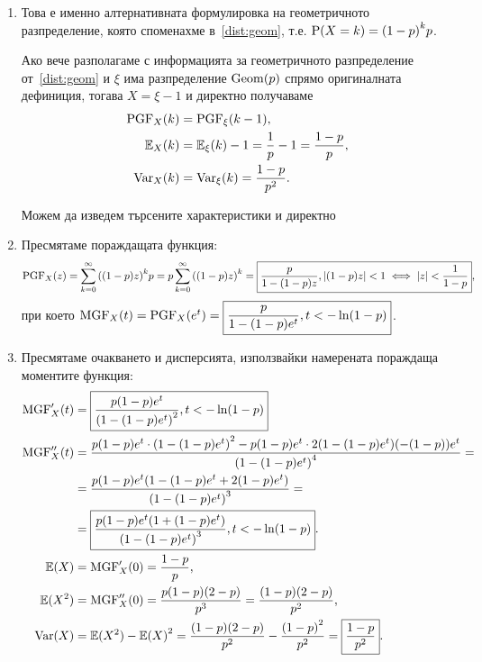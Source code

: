 \documentclass[numbers=endperiod, DIV=15, bibliography=totocnumbered]{scrartcl}
\begin{document}
\begin{solution}
  \mbox{}
  \begin{enumerate}[label=\alph*)]
    \item Това е именно алтернативната формулировка на геометричното разпределение, която споменахме в~\ref{dist:geom}, т.е. $\operatorname{P}(X = k) = {(1-p)}^k p$.

    Ако вече разполагаме с информацията за геометричното разпределение от~\ref{dist:geom} и $\xi$ има разпределение $\operatorname{Geom}(p)$ спрямо оригиналната дефиниция, тогава $X = \xi - 1$ и директно получаваме
    \begin{align*}
      \operatorname{PGF}_X(k) &= \operatorname{PGF}_\xi(k-1), \\
      \mathbb{E}_X(k) &= \mathbb{E}_\xi(k) - 1 = \frac 1 p - 1 = \frac {1-p} p, \\
      \operatorname{Var}_X(k) &= \operatorname{Var}_\xi(k) = \frac {1-p} {p^2}.
    \end{align*}

    Можем да изведем търсените характеристики и директно
    \item Пресмятаме пораждащата функция:
    \begin{displaymath}
      \operatorname{PGF}_X(z)
      =
      \sum_{k=0}^\infty {((1-p) z)}^k p
      =
      p \sum_{k=0}^\infty {((1-p) z)}^k
      =
      \boxed{\frac p {1 - (1-p)z}, \left\vert (1-p) z \right\vert < 1 \iff \left\vert z \right\vert < \frac 1 {1-p}},
    \end{displaymath}
    при което $\operatorname{MGF}_X(t) = \operatorname{PGF}_X(e^t) = \boxed{\frac p {1 - (1-p)e^t}, t < -\ln(1-p)}$.

    \item Пресмятаме очакването и дисперсията, използвайки намерената пораждаща моментите функция:
    \begingroup
    \allowdisplaybreaks
    \begin{align*}
      \operatorname{MGF}'_X(t)
      &=
      \boxed{\frac {p (1-p) e^t} {{(1-(1-p)e^t)}^2}, t < -\ln(1-p)}
      \\
      \operatorname{MGF}''_X(t)
      &=
      \frac {p (1-p) e^t \cdot {(1-(1-p)e^t)}^2 - p (1-p) e^t \cdot 2 (1-(1-p)e^t) (-(1-p)) e^t} {{(1-(1-p)e^t)}^4}
      = \\ &=
      \frac {p (1-p) e^t (1-(1-p)e^t+2(1-p)e^t)} {{(1-(1-p)e^t)}^3}
      = \\ &=
      \boxed{\frac {p (1-p) e^t(1+(1-p)e^t)} {{(1-(1-p)e^t)}^3}, t < -\ln(1-p)}.
      \\
      \mathbb{E}(X)
      &=
      \operatorname{MGF}'_X(0)
      =
      \frac {1-p} p,
      \\
      \mathbb{E}(X^2)
      &=
      \operatorname{MGF}''_X(0)
      =
      \frac {p(1-p)(2-p)} {p^3}
      =
      \frac {(1-p)(2-p)} {p^2},
      \\
      \operatorname{Var}(X)
      &=
      \mathbb{E}(X^2) - {\mathbb{E}(X)}^2
      =
      \frac {(1-p)(2-p)} {p^2} - \frac {{(1-p)}^2} {p^2}
      =
      \boxed{\frac {1-p} {p^2}}.
    \end{align*}
    \endgroup


\end{enumerate}
\end{solution}
\end{document}
